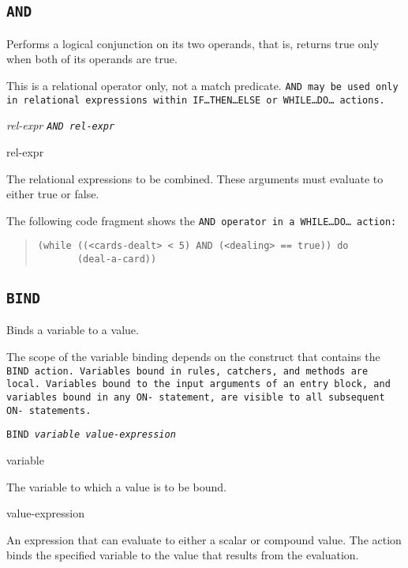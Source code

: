 \subsection{\tt{AND}}

Performs a logical conjunction on its two operands, that is, returns
true only when both of its operands are true.

\begin{note}
  This is a relational operator only, not a match predicate. \tt{AND}
  may be used only in relational expressions within
  \tt{IF}\ldots\tt{THEN}\ldots\tt{ELSE} or
  \tt{WHILE}\ldots\tt{DO}\ldots{} actions.
\end{note}

\Format

\it{rel-expr} \tt{AND} \it{rel-expr}

\begin{operands}
\item[rel-expr]

  The relational expressions to be combined. These arguments must
  evaluate to either true or false.
\end{operands}

\Example

The following code fragment shows the \tt{AND} operator in a
\tt{WHILE}\ldots\tt{DO}\ldots{} action:

\begin{quote}
\begin{verbatim}
(while ((<cards-dealt> < 5) AND (<dealing> == true)) do
       (deal-a-card))
\end{verbatim}
\end{quote}

\subsection{\tt{BIND}}

Binds a variable to a value.

The scope of the variable binding depends on the construct that
contains the \tt{BIND} action. Variables bound in rules, catchers, and
methods are local. Variables bound to the input arguments of an entry
block, and variables bound in any \tt{ON}- statement, are visible to
all subsequent \tt{ON}- statements.

\Format

\tt{BIND} \it{variable} \it{value-expression}

\begin{arguments}
\item[variable]

  The variable to which a value is to be bound.

\item[value-expression]

  An expression that can evaluate to either a scalar or compound
  value. The action binds the specified variable to the value that
  results from the evaluation.
\end{arguments}

